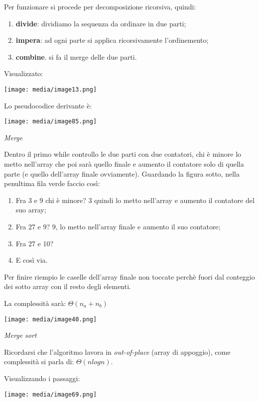 Per funzionare si procede per decomposizione ricorsiva, quindi:

\begin{enumerate}
\def\labelenumi{\arabic{enumi}.}
\item
  \textbf{divide}: dividiamo la sequenza da ordinare in due parti;
\item
  \textbf{impera}: ad ogni parte si applica ricorsivamente
  l'ordinemento;
\item
  \textbf{combine}. si fa il merge delle due parti.
\end{enumerate}

Visualizzato:

\texttt{[image: media/image13.png]}

Lo pseudocodice derivante è:

\texttt{[image: media/image85.png]}

\emph{Merge}

Dentro il primo while controllo le due parti con due contatori, chi è
minore lo metto nell'array che poi sarà quello finale e aumento il
contatore solo di quella parte (e quello dell'array finale ovviamente).
Guardando la figura sotto, nella penultima fila verde faccio così:

\begin{enumerate}
\def\labelenumi{\arabic{enumi}.}
\item
  Fra 3 e 9 chi è minore? 3 quindi lo metto nell'array e aumento il
  contatore del suo array;
\item
  Fra 27 e 9? 9, lo metto nell'array finale e aumento il suo contatore;
\item
  Fra 27 e 10?
\item
  E così via.
\end{enumerate}

Per finire riempio le caselle dell'array finale non toccate perchè fuori
dal conteggio dei sotto array con il resto degli elementi.

La complessità sarà: \(\Theta(n_{a} + n_{b})\)

\texttt{[image: media/image40.png]}

\emph{Merge sort}

Ricordarsi che l'algoritmo lavora in \emph{out-of-place} (array di
appoggio), come complessità si parla di: \(\Theta(nlogn)\).

Visualizzando i passaggi:

\texttt{[image: media/image69.png]}

